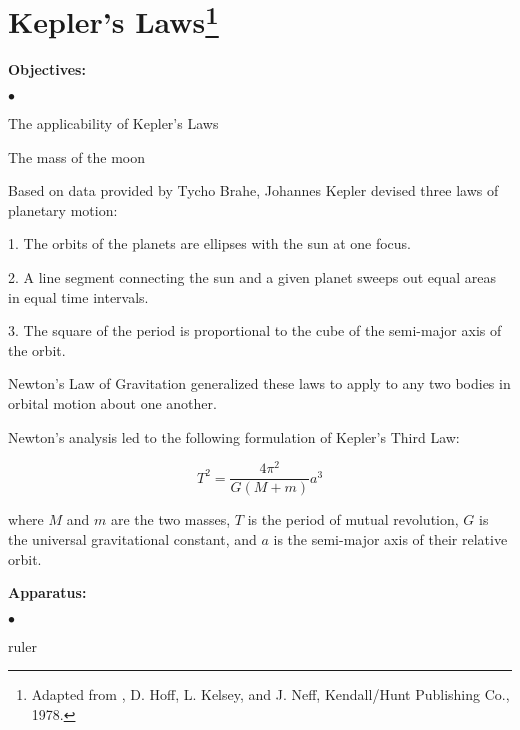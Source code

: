 
\section{Kepler's Laws\footnote{
Adapted from , D. Hoff, L. Kelsey, and J.
Neff, Kendall/Hunt Publishing Co., 1978.
}}

\makelabheader %

{\noindent \bf Objectives:} \begin{list}{$\bullet$}{\itemsep0pt }

\item The applicability of Kepler's Laws \item The mass of the moon

\end{list}


\noindent Based on data provided by Tycho Brahe, Johannes Kepler devised three laws of planetary motion:

1. The orbits of the planets are ellipses with the sun at one focus.

2. A line segment connecting the sun and a given planet sweeps out equal areas in equal time intervals.

3. The square of the period is proportional to the cube of the semi-major axis of the orbit.

\noindent Newton's Law of Gravitation generalized these laws to apply to any two bodies in orbital motion about one another.

\noindent Newton's analysis led to the following formulation of Kepler's Third Law:

\begin{equation} T^2 = \frac{4\pi^2}{G(M + m)}a^3 \end{equation}

\noindent where $M$ and $m$ are the two masses, $T$ is the period of mutual revolution, $G$ is the universal gravitational constant, and $a$ is the semi-major axis of their relative orbit. 
\medskip

{\noindent \bf Apparatus:} \begin{list}{$\bullet$}{\itemsep0pt }

\item ruler

\end{list}

